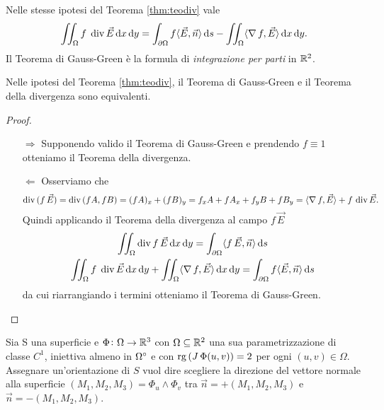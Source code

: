 \begin{thm}
	Nelle stesse ipotesi del Teorema \ref{thm:teodiv} vale
	\begin{equation}
		\iint_{\Omega} f \; \div{\vec{E}} \dif{x} \dif{y} = \int_{\partial \Omega} f \langle {\vec{E}, \vec{n}} \rangle \dif{s} - \iint_{\Omega} \langle {\grad{f}, \vec{E}} \rangle \dif{x} \dif{y}.
	\end{equation}
	Il Teorema di Gauss-Green è la formula di \emph{integrazione per parti} in $ \mathbb{R}^2 $.
\end{thm}

\begin{prop} 
	Nelle ipotesi del Teorema \ref{thm:teodiv}, il Teorema di Gauss-Green e il Teorema della divergenza sono equivalenti.
\end{prop}
%
\begin{proof}
	\begin{enumerate}
		\item[$ \Rightarrow $] Supponendo valido il Teorema di Gauss-Green e prendendo $ f \equiv 1 $ otteniamo il Teorema della divergenza.
		\item[$ \Leftarrow $] Osserviamo che 
		\[
			\operatorname{div}{(f \, \vec{E})} = \operatorname{div}{(f A, f B)} = (f A)_x + (f B)_y = f_x A + f A_x + f_y B + f B_y = \langle {\operatorname{\nabla}{f}, \vec{E}} \rangle + f \, \operatorname{div}{\vec{E}}.
		\]
		Quindi applicando il Teorema della divergenza al campo $ f \, \vec{E} $
		\begin{gather*}
			\iint_{\Omega} \div{f \, \vec{E}} \dif{x} \dif{y} = \int_{\partial \Omega} \langle {f \, \vec{E}, \vec{n}} \rangle \dif{s} \\
				\iint_{\Omega} f \; \div{\vec{E}} \dif{x} \dif{y} + \iint_{\Omega} \langle {\grad{f}, \vec{E}} \rangle \dif{x} \dif{y} = \int_{\partial \Omega} f \langle {\vec{E}, \vec{n}} \rangle \dif{s}
		\end{gather*}
		da cui riarrangiando i termini otteniamo il Teorema di Gauss-Green. \qedhere
	\end{enumerate}
\end{proof}

\begin{definition}
	Sia S una superficie e $ \Phi \colon \Omega \to \mathbb{R}^3 $ con $ \Omega \subseteq \mathbb{R}^2 $ una sua parametrizzazione di classe $ C^1 $, iniettiva almeno in $ {\Omega}^{\circ} $ e con $ \operatorname{rg}{(\operatorname{\mathit{J}}{\Phi}(u, v))} = 2 $ per ogni $ (u, v) \in \Omega $. Assegnare un'orientazione di $ S $ vuol dire scegliere la direzione del vettore normale alla superficie $ (M_1, M_2, M_3) = \Phi_u \wedge \Phi_v $ tra $ \vec{n} = + (M_1, M_2, M_3) $ e $ \vec{n} = - (M_1, M_2, M_3) $.
\end{definition}

